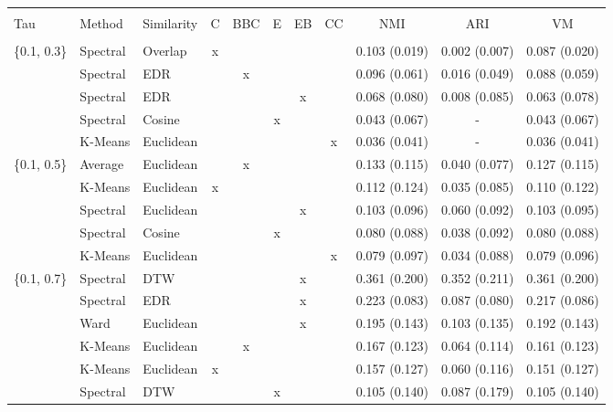 \documentclass[12pt,a4paper,bibliography=totocnumbered,listof=totocnumbered]{scrartcl}
\begin{document}
{\begin{appendix}
\begin{table}[H] \centering 
	\label{} 
	\scriptsize
		\begin{tabularx}{\textwidth}{ lllcccccccc} \\
		\\[-1.8ex]	\toprule
	 \\[-1.8ex] 
		Tau & Method & Similarity & C & BBC & E & EB & CC & NMI & ARI & VM \\ 
		\hline \\[-1.8ex] 
		\{0.1, 0.3\} & Spectral  & Overlap & x &  &  &  &  & 0.103 (0.019) & 0.002 (0.007) & 0.087 (0.020) \\ 
		& Spectral  & EDR &  & x &  &  &  & 0.096 (0.061) & 0.016 (0.049) & 0.088 (0.059) \\ 
		& Spectral  & EDR &  &  &  & x &  & 0.068 (0.080) & 0.008 (0.085) & 0.063 (0.078) \\ 
		& Spectral  & Cosine &  &  & x &  &  & 0.043 (0.067) & - & 0.043 (0.067) \\ 
		& K-Means & Euclidean  &  &  &  &  & x & 0.036 (0.041) &  -  & 0.036 (0.041) \\ 
		\{0.1, 0.5\} & Average & Euclidean  &  & x &  &  &  & 0.133 (0.115) & 0.040 (0.077) & 0.127 (0.115) \\ 
		& K-Means & Euclidean  & x &  &  &  &  & 0.112 (0.124) & 0.035 (0.085) & 0.110 (0.122) \\ 
		& Spectral  & Euclidean  &  &  &  & x &  & 0.103 (0.096) & 0.060 (0.092) & 0.103 (0.095) \\ 
		& Spectral  & Cosine &  &  & x &  &  & 0.080 (0.088) & 0.038 (0.092) & 0.080 (0.088) \\ 
		& K-Means & Euclidean  &  &  &  &  & x & 0.079 (0.097) & 0.034 (0.088) & 0.079 (0.096) \\ 
		\{0.1, 0.7\} & Spectral  & DTW &  &  &  & x &  & 0.361 (0.200) & 0.352 (0.211) & 0.361 (0.200) \\ 
		& Spectral  & EDR &  &  &  & x &  & 0.223 (0.083) & 0.087 (0.080) & 0.217 (0.086) \\ 
		& Ward & Euclidean  &  &  &  & x &  & 0.195 (0.143) & 0.103 (0.135) & 0.192 (0.143) \\ 
		& K-Means & Euclidean  &  & x &  &  &  & 0.167 (0.123) & 0.064 (0.114) & 0.161 (0.123) \\ 
		& K-Means & Euclidean  & x &  &  &  &  & 0.157 (0.127) & 0.060 (0.116) & 0.151 (0.127) \\ 
		& Spectral  & DTW &  &  & x &  &  & 0.105 (0.140) & 0.087 (0.179) & 0.105 (0.140) \\ 

\end{tabularx}
\end{table}
\end{appendix}}
\end{document}
